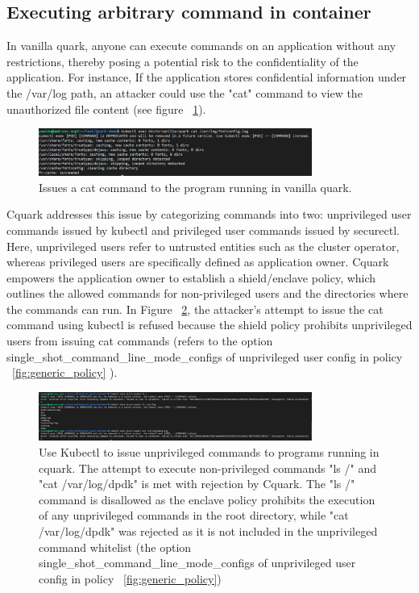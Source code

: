 \subsection{Executing arbitrary command in container}
In vanilla quark, anyone can execute commands on an application without any restrictions, thereby posing a potential risk to the confidentiality of the application.  For instance, If the application stores confidential information under the /var/log path, an attacker could use the "cat" 
command to view the unauthorized file content (see figure ~\ref{fig:vanila_execute_cat_cmd}).


\begin{figure}[H]
    \centering
    \includegraphics[width=0.8\textwidth]{images/vanila_execute_cat_cmd.png}
    \caption[Issues a cat command to the program running in vanilla quark]{Issues a cat command to the program running in vanilla quark.}
    \label{fig:vanila_execute_cat_cmd}
\end{figure}


Cquark addresses this issue by categorizing commands into two: unprivileged user commands issued by kubectl and privileged user commands issued by securectl. Here, unprivileged users refer to untrusted entities such as the cluster operator, 
whereas privileged users are specifically defined as application owner. Cquark empowers the application owner to establish a shield/enclave policy, which outlines the allowed commands for non-privileged users and the directories where the commands can run. 
In Figure ~\ref{fig:cuqark_unprivileged_user_cat_rejected}, the attacker's attempt to issue the cat command using kubectl is refused because the shield policy prohibits unprivileged users from issuing cat commands (refers to the option single\_shot\_command\_line\_mode\_configs of 
unprivileged user config in policy ~\ref{fig:generic_policy} ).

\begin{figure}[H]
    \centering
    \includegraphics[width=0.8\textwidth]{images/cuqark_unprivileged_user_cat_rejected.png}
    \caption[Use Kubectl to issue unprivileged commands to programs running in confidential quark]{Use Kubectl to issue unprivileged commands to programs running in cquark.  The attempt to execute non-privileged commands "ls /" and "cat /var/log/dpdk" is met with rejection by Cquark. 
    The "ls /" command is disallowed as the enclave policy prohibits the execution of any unprivileged commands in the root directory, while "cat /var/log/dpdk" was rejected as it is not included in the unprivileged command whitelist (the option single\_shot\_command\_line\_mode\_configs of 
    unprivileged user config in policy ~\ref{fig:generic_policy}) }
    \label{fig:cuqark_unprivileged_user_cat_rejected}
\end{figure}

